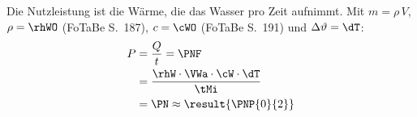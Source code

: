Die Nutzleistung ist die Wärme, die das Wasser pro Zeit aufnimmt. Mit $m = \rho\,V$, $\rho = \rhWO$ (FoTaBe S.~187), $c = \cWO$ (FoTaBe S.~191) und $\Delta\vartheta = \dT$:
\begin{align}
 P &= \frac{Q}{t} = \PNF \\
   &= \frac{\rhW\cdot\VWa\cdot\cW\cdot\dT}{\tMi} \\
   &= \PN \approx \result{\PNP{0}{2}}
\end{align}
